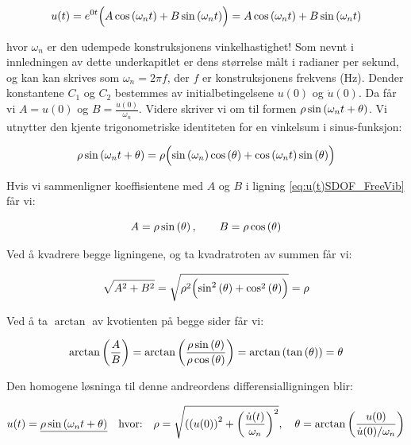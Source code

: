 \begin{equation} \label{eq:u(t)SDOF_FreeVib}
    u(t) = e^{0t}\Bigl(A \cos \left({\omega_n t}\right) + B \sin \left({\omega_n t}\right)\Bigr) = A \cos \left({\omega_n t}\right) + B \sin \left({\omega_n t}\right)
\end{equation}

hvor $\omega_n$ er den udempede konstruksjonens vinkelhastighet! Som nevnt i innledningen av dette underkapitlet er dens størrelse målt i radianer per sekund, og kan kan skrives som $\omega_n =  2\pi f$, der $f$ er konstruksjonens frekvens (Hz). Dender konstantene $C_1$ og $C_2 $ bestemmes av initialbetingelsene $u(0)$ og $\dot{u}(0)$.  Da får vi $A = u(0)$ og $B = \frac{\dot{u}(0)}{\omega_n}$. Videre skriver vi om til formen $\rho \sin \left({\omega_n t+ \theta}\right)$. Vi utnytter den kjente trigonometriske identiteten for en vinkelsum i sinus-funksjon:

\begin{equation} \label{eq:SumAvVinklerSinurs}
    \rho \sin \left({\omega_n t+ \theta}\right) = \rho \Bigl(\sin \left({\omega_n}\right) \cos \left({\theta}\right) + \cos \left({\omega_n t}\right) \sin \left({\theta}\right) \Bigr)
\end{equation}

Hvis vi sammenligner koeffisientene med $A$ og $B$ i ligning \eqref{eq:u(t)SDOF_FreeVib} får vi:

\begin{equation} \label{eq:KoeffisienterSinCos}
    A = \rho \sin \left({\theta}\right), \qquad B = \rho \cos \left({\theta}\right)
\end{equation}

Ved å kvadrere begge ligningene, og ta kvadratroten av summen får vi:

\begin{equation} \label{eq:rhoSDOFFreeVib}
    \sqrt{A^2 + B^2} = \sqrt{\rho^2 \Bigl({\sin^2\left({\theta}\right) + \cos^2\left({\theta}\right)\Bigr)}} = \rho
\end{equation}

Ved å ta $\arctan$ av kvotienten på begge sider får vi:

\begin{equation} \label{eq:arctan}
    \arctan \left({\frac{A}{B}}\right) = \arctan \left({\frac{\rho \sin \left({\theta}\right)}{\rho \cos \left({\theta}\right)}}\right) = \arctan \left({\tan \left({\theta}\right)}\right) = \theta
\end{equation}

Den homogene løsninga til denne andreordens differensialligningen blir: 

\begin{equation} \label{eq: AndreOrdensDiffLigning}
    u(t) = \underline{\rho \sin \left({\omega_n t + \theta}\right)} \quad \text{hvor:} \quad \rho = \sqrt{\left({(u(0)}\right)^2 + \left({\frac{\dot{u}(t)}{\omega_n}}\right)^2}, \quad \theta = \arctan \left({\frac{u(0)}{\dot{u}(0) / \omega_n}}\right)
\end{equation}